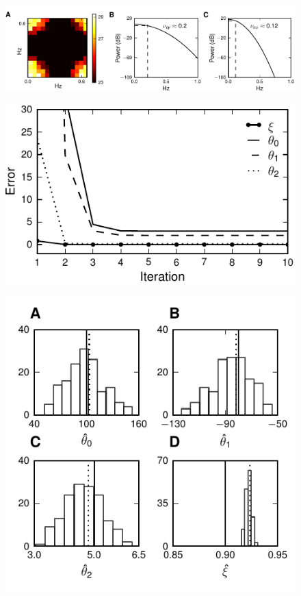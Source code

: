 \documentclass[review,authoryear,3p]{elsarticle}
\begin{document}
\clearpage
\newpage
\begin{figure}[!ht]
\begin{center}
\includegraphics{./Graph/pdf/fig5.pdf}
\end{center}
\caption{}
\label{fig:Figure5}
\end{figure}
\clearpage
\newpage
\begin{figure}[!ht]
\begin{center}
\includegraphics{./Graph/pdf/fig6.pdf}
\end{center}
\caption{}
\label{fig:Figure6}
\end{figure}
\clearpage
\newpage
\begin{figure}[!ht]
\begin{center}
\includegraphics{./Graph/pdf/fig7.pdf}
\end{center}
\caption{}
\label{fig:Figure7}
\end{figure}
\end{document}
